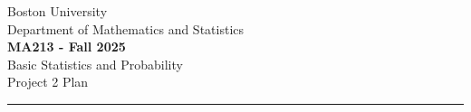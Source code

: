 \documentclass[12pt]{article}
\begin{document}
	
	
	
	\begin{center}		
        Boston University \\
        Department of Mathematics and Statistics \\ 
		\Large{\textbf{MA213 - Fall 2025}} \\ 
        \large{Basic Statistics and Probability} \\
        \large{Project 2 Plan} \\ 
		\noindent\rule{16cm}{2pt}
	\end{center}
	
\end{document}
